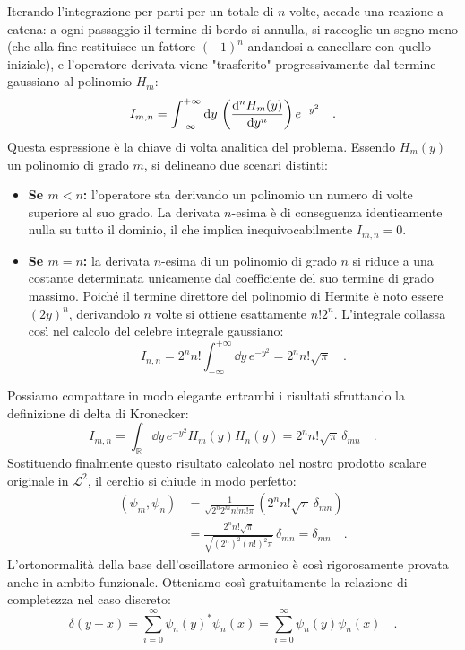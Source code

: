 Iterando l'integrazione per parti per un totale di $n$ volte, accade una reazione a catena: a ogni passaggio il termine di bordo si annulla, si raccoglie un segno meno (che alla fine restituisce un fattore $(-1)^n$ andandosi a cancellare con quello iniziale), e l'operatore derivata viene "trasferito" progressivamente dal termine gaussiano al polinomio $H_m$:
\[
    I_{m,n} = \int_{-\infty}^{+\infty} \dd{y} \, \left( \dv[n]{H_m(y)}{y} \right) e^{-y^2} \quad.
\]
Questa espressione è la chiave di volta analitica del problema. Essendo $H_m(y)$ un polinomio di grado $m$, si delineano due scenari distinti:
\begin{itemize}
    \item \textbf{Se $m < n$:} l'operatore sta derivando un polinomio un numero di volte superiore al suo grado. La derivata $n$-esima è di conseguenza identicamente nulla su tutto il dominio, il che implica inequivocabilmente $I_{m,n} = 0$.
    \item \textbf{Se $m = n$:} la derivata $n$-esima di un polinomio di grado $n$ si riduce a una costante determinata unicamente dal coefficiente del suo termine di grado massimo. Poiché il termine direttore del polinomio di Hermite è noto essere $(2y)^n$, derivandolo $n$ volte si ottiene esattamente $n! 2^n$. L'integrale collassa così nel calcolo del celebre integrale gaussiano:
    \[
        I_{n,n} = 2^n n! \int_{-\infty}^{+\infty} \dd{y} \, e^{-y^2} = 2^n n! \sqrt{\pi} \quad.
    \]
\end{itemize}
Possiamo compattare in modo elegante entrambi i risultati sfruttando la definizione di delta di Kronecker:
\[
    I_{m,n} = \int_{\mathbb{R}} \dd{y} \, e^{-y^2}H_m(y)H_n(y) = 2^n n! \sqrt{\pi} \, \delta_{mn} \quad.
\]
Sostituendo finalmente questo risultato calcolato nel nostro prodotto scalare originale in $\mathcal{L}^2$, il cerchio si chiude in modo perfetto:
\[
\begin{aligned}
    (\psi_m,\psi_n) &= \frac{1}{\sqrt{2^n2^m n! m! \pi}} \left( 2^n n! \sqrt{\pi} \, \delta_{mn} \right) \\
    &= \frac{2^n n! \sqrt{\pi}}{\sqrt{(2^n)^2 (n!)^2 \pi}} \, \delta_{mn} = \delta_{mn} \quad.
\end{aligned}
\]
L'ortonormalità della base dell'oscillatore armonico è così rigorosamente provata anche in ambito funzionale. Otteniamo così gratuitamente la relazione di completezza nel caso discreto:
\[
    \delta(y-x) = \sum_{i=0}^\infty \psi_n(y)^* \psi_n(x) = \sum_{i=0}^\infty \psi_n(y) \psi_n(x) \quad.
\]

